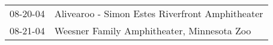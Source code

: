 \begin{supertabular}{p{0.07\textwidth}p{0.23\textwidth}}
 08-20-04 &  Alivearoo - Simon Estes Riverfront Amphitheater \\
 08-21-04 &       Weesner Family Amphitheater, Minnesota Zoo \\
\end{supertabular}
